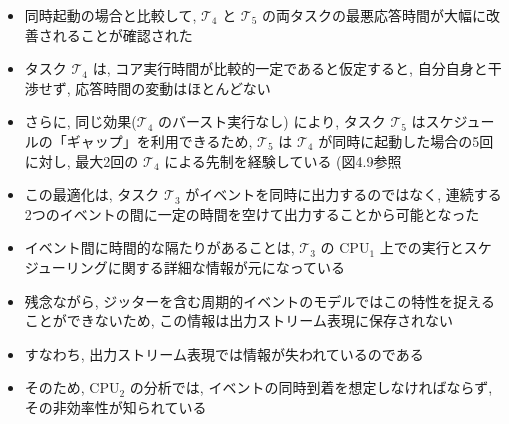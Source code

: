 \begin{frame}{}
    \begin{itemize}
        \item 同時起動の場合と比較して, $\mathcal{T}_{4}$ と $\mathcal{T}_{5}$ の両タスクの最悪応答時間が大幅に改善されることが確認された
        \item タスク $\mathcal{T}_{4}$ は, コア実行時間が比較的一定であると仮定すると, 自分自身と干渉せず, 応答時間の変動はほとんどない
        \item さらに, 同じ効果($\mathcal{T}_{4}$ のバースト実行なし) により, タスク $\mathcal{T}_{5}$ はスケジュールの「ギャップ」を利用できるため, $\mathcal{T}_{5}$ は $\mathcal{T}_{4}$ が同時に起動した場合の5回に対し, 最大2回の $\mathcal{T}_{4}$ による先制を経験している (図4.9参照
    \end{itemize}
\end{frame}

\begin{frame}{}
\end{frame}

\begin{frame}{}
    \begin{itemize}
        \item この最適化は, タスク $\mathcal{T}_{3}$ がイベントを同時に出力するのではなく, 連続する2つのイベントの間に一定の時間を空けて出力することから可能となった
        \item イベント間に時間的な隔たりがあることは, $\mathcal{T}_{3}$ の $\mathrm{CPU}_{1}$ 上での実行とスケジューリングに関する詳細な情報が元になっている
        \item 残念ながら, ジッターを含む周期的イベントのモデルではこの特性を捉えることができないため, この情報は出力ストリーム表現に保存されない
        \item すなわち, 出力ストリーム表現では情報が失われているのである
        \item そのため, $\mathrm{CPU}_{2}$ の分析では, イベントの同時到着を想定しなければならず, その非効率性が知られている
    \end{itemize}
\end{frame}

